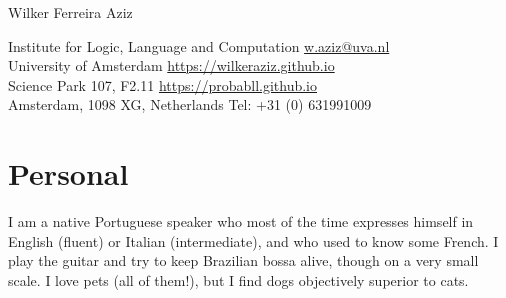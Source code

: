 \documentclass[10pt,a4paper,oneside]{article}
\makeatletter
\newcommand{\myname}{Wilker Ferreira Aziz\xspace}
\newcommand{\birthday}{13/11/1985\xspace}
\newcommand{\location}{S\~ao Paulo, SP -- Brazil\xspace}
\newcommand{\citizenships}{Brazilian\xspace}
\newcommand{\contact}{Institute for Logic, Language and Computation \hfill \url{w.aziz@uva.nl} \\ 
University of Amsterdam \hfill \url{https://wilkeraziz.github.io} \\
Science Park 107, F2.11 \hfill \url{https://probabll.github.io} \\
Amsterdam, 1098 XG, Netherlands  \hfill Tel: +31 (0) 631991009 
}
\makeatother
\begin{document}




\begin{center}
{\large \sc
\myname \\
}
\end{center}



\begin{addmargin}[0em]{2em}%
\contact
\end{addmargin}



















\pagebreak 



%




\section*{Personal}


I am a native Portuguese speaker who most of the time expresses himself in English (fluent) or Italian (intermediate), and who used to know some French. I play the guitar and try to keep Brazilian bossa alive, though on a very small scale. I love pets (all of them!), but I find dogs objectively superior to cats. 
\end{document}
